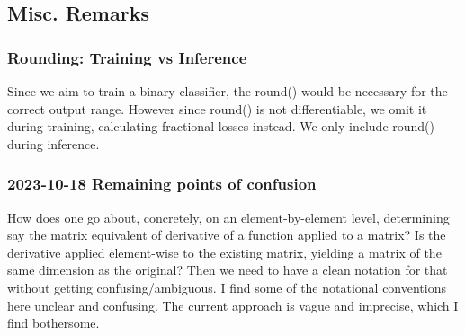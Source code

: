 \documentclass{article}
\begin{document}


\subsection{Misc. Remarks}
\subsubsection{Rounding: Training vs Inference} Since we aim to train a binary classifier, the round() would be necessary for the correct output range. However since round() is not differentiable, we omit it during training, calculating fractional losses instead. We only include round() during inference.
\subsubsection{2023-10-18 Remaining points of confusion} How does one go about, concretely, on an element-by-element
level, determining say the matrix equivalent of derivative of a function applied to a matrix? 
Is the derivative applied element-wise to the existing matrix, yielding a matrix of the same dimension as the original?
Then we need to have a clean notation for that without getting confusing/ambiguous. I find some of the notational
conventions here unclear and confusing. The current approach is vague and imprecise, which I find bothersome.
\end{document}

